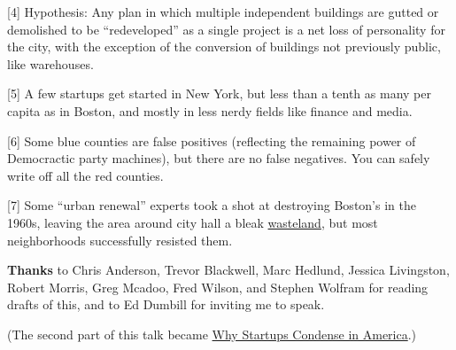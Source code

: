 {[}4{]} Hypothesis: Any plan in which multiple independent buildings are
gutted or demolished to be ``redeveloped'' as a single project is a net
loss of personality for the city, with the exception of the conversion
of buildings not previously public, like warehouses.

{[}5{]} A few startups get started in New York, but less than a tenth as
many per capita as in Boston, and mostly in less nerdy fields like
finance and media.

{[}6{]} Some blue counties are false positives (reflecting the remaining
power of Democractic party machines), but there are no false negatives.
You can safely write off all the red counties.

{[}7{]} Some ``urban renewal'' experts took a shot at destroying
Boston's in the 1960s, leaving the area around city hall a bleak
\href{http://www.pps.org/great_public_spaces/one?public_place_id=148}{wasteland},
but most neighborhoods successfully resisted them.

\textbf{Thanks} to Chris Anderson, Trevor Blackwell, Marc Hedlund,
Jessica Livingston, Robert Morris, Greg Mcadoo, Fred Wilson, and Stephen
Wolfram for reading drafts of this, and to Ed Dumbill for inviting me to
speak.

(The second part of this talk became \href{america.html}{Why Startups
Condense in America}.)
